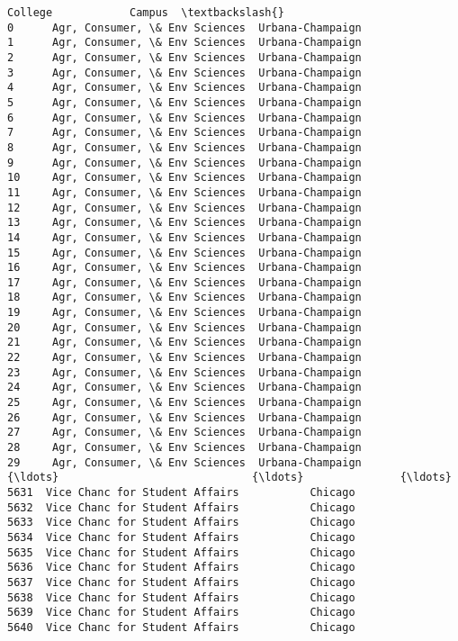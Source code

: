 \documentclass[11pt]{article}
\begin{document}
    \begin{Verbatim}[commandchars=\\\{\}]
                             College            Campus  \textbackslash{}
0      Agr, Consumer, \& Env Sciences  Urbana-Champaign   
1      Agr, Consumer, \& Env Sciences  Urbana-Champaign   
2      Agr, Consumer, \& Env Sciences  Urbana-Champaign   
3      Agr, Consumer, \& Env Sciences  Urbana-Champaign   
4      Agr, Consumer, \& Env Sciences  Urbana-Champaign   
5      Agr, Consumer, \& Env Sciences  Urbana-Champaign   
6      Agr, Consumer, \& Env Sciences  Urbana-Champaign   
7      Agr, Consumer, \& Env Sciences  Urbana-Champaign   
8      Agr, Consumer, \& Env Sciences  Urbana-Champaign   
9      Agr, Consumer, \& Env Sciences  Urbana-Champaign   
10     Agr, Consumer, \& Env Sciences  Urbana-Champaign   
11     Agr, Consumer, \& Env Sciences  Urbana-Champaign   
12     Agr, Consumer, \& Env Sciences  Urbana-Champaign   
13     Agr, Consumer, \& Env Sciences  Urbana-Champaign   
14     Agr, Consumer, \& Env Sciences  Urbana-Champaign   
15     Agr, Consumer, \& Env Sciences  Urbana-Champaign   
16     Agr, Consumer, \& Env Sciences  Urbana-Champaign   
17     Agr, Consumer, \& Env Sciences  Urbana-Champaign   
18     Agr, Consumer, \& Env Sciences  Urbana-Champaign   
19     Agr, Consumer, \& Env Sciences  Urbana-Champaign   
20     Agr, Consumer, \& Env Sciences  Urbana-Champaign   
21     Agr, Consumer, \& Env Sciences  Urbana-Champaign   
22     Agr, Consumer, \& Env Sciences  Urbana-Champaign   
23     Agr, Consumer, \& Env Sciences  Urbana-Champaign   
24     Agr, Consumer, \& Env Sciences  Urbana-Champaign   
25     Agr, Consumer, \& Env Sciences  Urbana-Champaign   
26     Agr, Consumer, \& Env Sciences  Urbana-Champaign   
27     Agr, Consumer, \& Env Sciences  Urbana-Champaign   
28     Agr, Consumer, \& Env Sciences  Urbana-Champaign   
29     Agr, Consumer, \& Env Sciences  Urbana-Champaign   
{\ldots}                              {\ldots}               {\ldots}   
5631  Vice Chanc for Student Affairs           Chicago   
5632  Vice Chanc for Student Affairs           Chicago   
5633  Vice Chanc for Student Affairs           Chicago   
5634  Vice Chanc for Student Affairs           Chicago   
5635  Vice Chanc for Student Affairs           Chicago   
5636  Vice Chanc for Student Affairs           Chicago   
5637  Vice Chanc for Student Affairs           Chicago   
5638  Vice Chanc for Student Affairs           Chicago   
5639  Vice Chanc for Student Affairs           Chicago   
5640  Vice Chanc for Student Affairs           Chicago   

\end{Verbatim}
\end{document}

